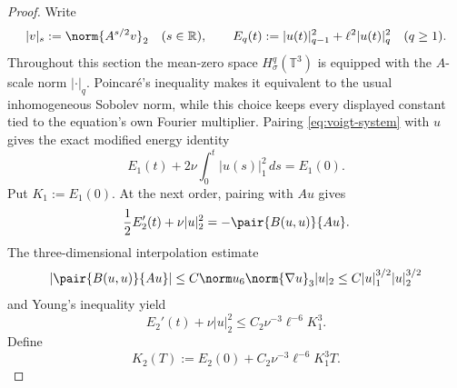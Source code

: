 \begin{proof}
Write
\begin{equation}
 |v|_s:=\norm{A^{s/2}v}_2\quad(s\in\mathbb R),
 \qquad
 E_q(t):=|u(t)|_{q-1}^2+\ell^2|u(t)|_q^2
 \quad(q\ge1).
 \label{eq:voigt-energy-level}
\end{equation}
Throughout this section the mean-zero space \(H^q_\sigma(\mathbb T^3)\) is
equipped with the \(A\)-scale norm \(|\cdot|_q\).  Poincar\'e's inequality
makes it equivalent to the usual inhomogeneous Sobolev norm, while this choice
keeps every displayed constant tied to the equation's own Fourier multiplier.
Pairing \eqref{eq:voigt-system} with \(u\) gives the exact modified energy
identity
\begin{equation}
 E_1(t)+2\nu\int_0^t|u(s)|_1^2\,ds=E_1(0).
 \label{eq:voigt-base-energy}
\end{equation}
Put \(K_1:=E_1(0)\).  At the next order, pairing with \(Au\) gives
\[
 \frac12E_2'(t)+\nu|u|_2^2=-\pair{B(u,u)}{Au}.
\]
The three-dimensional interpolation estimate
\begin{equation}
 |\pair{B(u,u)}{Au}|
 \le C\norm u_6\norm{\nabla u}_3|u|_2
 \le C|u|_1^{3/2}|u|_2^{3/2}
 \label{eq:voigt-second-row-product}
\end{equation}
and Young's inequality yield
\begin{equation}
 E_2'(t)+\nu|u|_2^2
 \le C_2\nu^{-3}\ell^{-6}K_1^3.
 \label{eq:voigt-second-row}
\end{equation}
Define
\begin{equation}
 K_2(T):=E_2(0)+C_2\nu^{-3}\ell^{-6}K_1^3T.
 \label{eq:voigt-K2}
\end{equation}


\end{proof}
